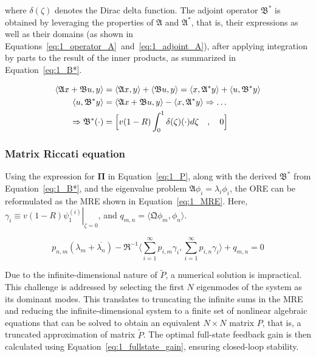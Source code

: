 where $\delta(\zeta)$ denotes the Dirac delta function. The adjoint operator $\mathfrak{B}^*$ is obtained by leveraging the properties of $\mathfrak{A}$ and $\mathfrak{A}^*$, that is, their expressions as well as their domains (as shown in Equations~\ref{eq:1_operator_A}~and~\ref{eq:1_adjoint_A}), after applying integration by parts to the result of the inner products, as summarized in Equation~\ref{eq:1_B*}.

\begin{equation} \label{eq:1_B*}
    \begin{aligned}
        \langle \mathfrak{A} {x} + \mathfrak{B} u, {y} \rangle
        &= \langle \mathfrak{A} {x}, {y} \rangle
        + \langle \mathfrak{B} u, {y} \rangle
        = \langle {x}, \mathfrak{A}^* {y}\rangle
        + \langle u, \mathfrak{B}^* {y} \rangle \\
        \langle u, \mathfrak{B}^* {y} \rangle
        &= \langle \mathfrak{A} {x} + \mathfrak{B} u, {y} \rangle
        - \langle {x}, \mathfrak{A}^* {y}\rangle
        \Rightarrow \hdots \\ \Rightarrow \mathfrak{B}^* (\cdot) &= \Bigl[ v(1-R) \int_0^1 \delta(\zeta) (\cdot) d\zeta \quad , \quad 0 \Bigr]
    \end{aligned}
\end{equation}

\subsubsection{Matrix Riccati equation}

Using the expression for $\mathbf{\Pi}$ in Equation~\ref{eq:1_P}, along with the derived $\mathfrak{B}^*$ from Equation~\ref{eq:1_B*}, and the eigenvalue problem $\mathfrak{A}{\phi_i} = \lambda_i {\phi_i}$, the ORE can be reformulated as the MRE shown in Equation~\ref{eq:1_MRE}. Here, $\gamma_i \equiv v(1-R) \left. \psi_{1}^{(i)} \right|_{\zeta = 0}$, and $q_{m,n} = \langle \mathfrak{Q} {\phi_m}, {\phi_n} \rangle$.

\begin{equation}\label{eq:1_MRE}
    p_{n,m} (\lambda_m + \overline{\lambda_n})
    - \mathfrak{R}^{-1} \langle \sum_{i=1}^\infty p_{i,m} \gamma_i, \sum_{i=1}^\infty p_{i,n} \gamma_i \rangle
    + q_{m,n} = 0
\end{equation}

Due to the infinite-dimensional nature of $\tilde{P}$, a numerical solution is impractical. This challenge is addressed by selecting the first $N$ eigenmodes of the system as its dominant modes. This translates to truncating the infinite sums in the MRE and reducing the infinite-dimensional system to a finite set of nonlinear algebraic equations that can be solved to obtain an equivalent $N \times N$ matrix $P$, that is, a truncated approximation of matrix $\tilde{P}$. The optimal full-state feedback gain is then calculated using Equation~\ref{eq:1_fullstate_gain}, ensuring closed-loop stability.

